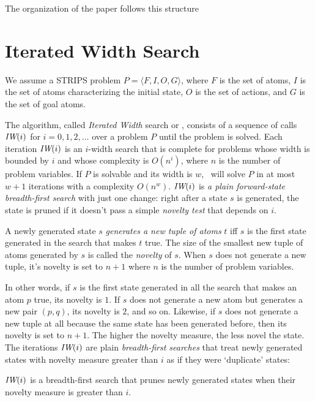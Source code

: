 \documentclass[letterpaper]{article}
\begin{document}
The organization of the paper follows this structure



\section{Iterated Width Search}

We assume a STRIPS problem $P = \langle F,I,O,G\rangle$, where $F$ is
the set of atoms, $I$ is the set of atoms characterizing the initial
state, $O$ is the set of actions, and $G$ is the set of goal atoms.

The  algorithm, called  \emph{Iterated Width} search or \IR, 
consists of a sequence of calls  ${\textit{IW}}(i)$ for $i=0, 1, 2, \ldots$
over a problem $P$ until the problem is solved.
Each iteration ${\textit{IW}}(i)$ is an $i$-width search that is complete for problems whose width is bounded by $i$
and whose  complexity is $O(n^{i})$,  where $n$ is the number of problem variables.
If $P$ is solvable and its  width is $w$,  \IR\ will solve $P$ in at most $w+1$ iterations
with a   complexity  $O(n^w)$.  ${\textit{IW}}(i)$ is 
\emph{a plain forward-state breadth-first search} with just one change: right after a state $s$ is generated, 
the state is  pruned if it doesn't pass a simple \emph{novelty test} that depends on $i$.

\begin{definition}
A newly generated state $s$  \emph{generates a  new tuple of atoms} $t$
iff $s$ is the first state generated in the search  that makes $t$ true. The size of the smallest new tuple
of atoms generated by $s$ is called the \emph{novelty} of $s$. When $s$ does not generate a new
tuple, it's novelty is set to $n+1$ where $n$ is the number of problem variables.
\end{definition}

In other words, if  $s$ is the first state generated in all the search that makes an atom $p$ true,
its novelty is  $1$. If $s$ does not generate a new atom but generates a new pair $(p,q)$,
its novelty is $2$, and so on.  Likewise, if $s$ does not generate a new tuple at all
because the same state has been generated before, then its novelty is set to $n+1$.
The higher the  novelty measure, the less novel the state.
The iterations ${\textit{IW}}(i)$ are  plain \emph{breadth-first searches} that treat newly generated
states with novelty measure greater than $i$ as if they were  `duplicate' states:


\begin{definition}
${\textit{IW}}(i)$ is a breadth-first search that prunes newly generated states when their novelty measure
is greater than $i$.
\end{definition}
\end{document}
